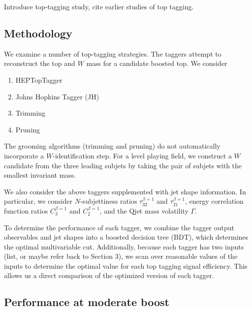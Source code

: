 Introduce top-tagging study, cite earlier studies of top tagging.

\subsection{Methodology}
We examine a number of top-tagging strategies. The taggers attempt to reconstruct the top and $W$ mass for a candidate boosted top. We consider
%
\begin{enumerate}
\item HEPTopTagger
\item Johns Hopkins Tagger (JH)
\item Trimming
\item Pruning
\end{enumerate}
%
The grooming algorithms (trimming and pruning) do not automatically incorporate a $W$-identification step. For a level playing field, we construct a $W$ candidate from the three leading subjets by taking the pair of subjets with the smallest invariant mass.

We also consider the above taggers supplemented with jet shape information. In particular, we consider $N$-subjettiness ratios $\tau_{32}^{\beta=1}$ and $\tau_{21}^{\beta=1}$, energy correlation function ratios $C_3^{\beta=1}$ and $C_2^{\beta=1}$, and the Qjet mass volatility $\Gamma$.

To determine the performance of each tagger, we combine the tagger output observables and jet shapes into a boosted decision tree (BDT), which determines the optimal multivariable cut. Additionally, because each tagger has two inputs (list, or maybe refer back to Section 3), we scan over reasonable values of the inputs to determine the optimal value for each top tagging signal efficiency. This allows us a direct comparison of the optimized version of each tagger. 

\subsection{Performance at moderate boost}

